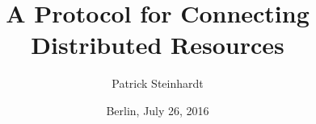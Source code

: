 \documentclass[12pt,a4paper,english]{book}
\title{A Protocol for Connecting Distributed Resources}
\author{Patrick Steinhardt}
\date{Berlin, July 26, 2016}
\begin{document}
    \pagestyle{plain}
    
    
    

    \tableofcontents
    \listoffigures

    \cleardoublepage

    \pagestyle{fancy}
    \setcounter{page}{1}

    
    
    
    
    
    
    
    

    \begin{appendices}
        
    \end{appendices}

    \nocite{*}
    
\end{document}
